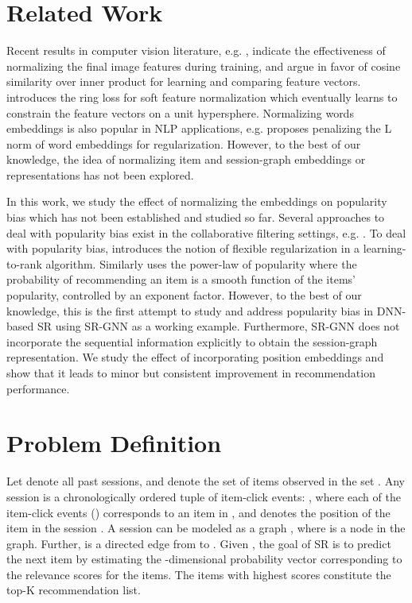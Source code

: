 \documentclass[sigconf]{acmart}
\begin{document}
\section{Related Work}


Recent results in computer vision literature, e.g. \cite{wang2017normface,zheng2018ring}, indicate the effectiveness of normalizing the final image features during training, and argue in favor of cosine similarity over inner product for learning and comparing feature vectors. 
\cite{zheng2018ring} introduces the ring loss for soft feature normalization which eventually learns to constrain the feature vectors on a unit hypersphere. Normalizing words embeddings is also popular in NLP applications, e.g. \cite{peng2015comparative} proposes penalizing the L norm of word embeddings for regularization. 
However, to the best of our knowledge, the idea of normalizing item and session-graph embeddings or representations has not been explored. 

In this work, we study the effect of normalizing the embeddings on popularity bias which has not been established and studied so far.
Several approaches to deal with popularity bias exist in the collaborative filtering settings, e.g. \cite{abdollahpouri2017controlling,steck2011item,yang2018unbiased}.
To deal with popularity bias, \cite{abdollahpouri2017controlling} introduces the notion of flexible regularization in a learning-to-rank algorithm. Similarly \cite{steck2011item,yang2018unbiased} uses the power-law of popularity where the probability of recommending an item is a smooth function of the items' popularity, controlled by an exponent factor. However, to the best of our knowledge, this is the first attempt to study and address popularity bias in DNN-based SR using SR-GNN \cite{wu2018session} as a working example.  
Furthermore, SR-GNN does not incorporate the sequential information explicitly to obtain the session-graph representation. We study the effect of incorporating position embeddings \cite{vaswani2017attention} and show that it leads to minor but consistent improvement in recommendation performance.







\section{Problem Definition\label{sec:prob_def}}		
Let  denote all past sessions, and  denote the set of  items observed in the set .
Any session  is a chronologically ordered tuple of item-click events: 
, where each of the  item-click events  () corresponds to an item in , and  denotes the position of the item  in the session .
A session  can be modeled as a graph , where  is a node in the graph. 
Further,  is a directed edge from  to .
Given , the goal of SR is to predict the next item  by estimating the -dimensional probability vector  corresponding to the relevance scores for the  items. 
The  items with highest scores constitute the top-K recommendation list.
\end{document}
